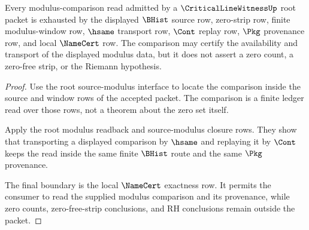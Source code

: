 \begin{theorem}
\label{thm:critical-line-witness-root-modulus-comparison-exhaustion}
Every modulus-comparison read admitted by a $\CriticalLineWitnessUp$ root packet is exhausted by the displayed $\BHist$ source row, zero-strip row, finite modulus-window row, $\hsame$ transport row, $\Cont$ replay row, $\Pkg$ provenance row, and local $\NameCert$ row. The comparison may certify the availability and transport of the displayed modulus data, but it does not assert a zero count, a zero-free strip, or the Riemann hypothesis.
\end{theorem}
\begin{proof}
Use the root source-modulus interface to locate the comparison inside the source and window rows of the accepted packet. The comparison is a finite ledger read over those rows, not a theorem about the zero set itself.

Apply the root modulus readback and source-modulus closure rows. They show that transporting a displayed comparison by $\hsame$ and replaying it by $\Cont$ keeps the read inside the same finite $\BHist$ route and the same $\Pkg$ provenance.

The final boundary is the local $\NameCert$ exactness row. It permits the consumer to read the supplied modulus comparison and its provenance, while zero counts, zero-free-strip conclusions, and RH conclusions remain outside the packet.
\end{proof}

